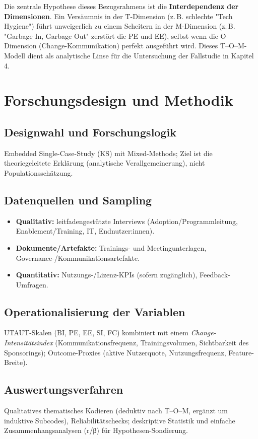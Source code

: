 \documentclass[12pt,a4paper,oneside]{article} %
\begin{document}
Die zentrale Hypothese dieses Bezugsrahmens ist die \textbf{Interdependenz der Dimensionen}. Ein Versäumnis in der T-Dimension (z.\,B. schlechte "Tech Hygiene") führt unweigerlich zu einem Scheitern in der M-Dimension (z.\,B. "Garbage In, Garbage Out" zerstört die PE und EE), selbst wenn die O-Dimension (Change-Kommunikation) perfekt ausgeführt wird. Dieses T–O–M-Modell dient als analytische Linse für die Untersuchung der Fallstudie in Kapitel 4.


\section{Forschungsdesign und Methodik}
\subsection{Designwahl und Forschungslogik}
Embedded Single-Case-Study (KS) mit Mixed-Methods; Ziel ist die theoriegeleitete Erklärung (analytische Verallgemeinerung), nicht Populationsschätzung.

\subsection{Datenquellen und Sampling}
\begin{itemize}
    \item \textbf{Qualitativ:} leitfadengestützte Interviews (Adoption/Programmleitung, Enablement/Training, IT, Endnutzer:innen).
    \item \textbf{Dokumente/Artefakte:} Trainings- und Meetingunterlagen, Governance-/Kommunikationsartefakte.
    \item \textbf{Quantitativ:} Nutzungs-/Lizenz-KPIs (sofern zugänglich), Feedback-Umfragen.
\end{itemize}

\subsection{Operationalisierung der Variablen}
UTAUT-Skalen (BI, PE, EE, SI, FC) kombiniert mit einem \emph{Change-Intensitätsindex} (Kommunikationsfrequenz, Trainingsvolumen, Sichtbarkeit des Sponsorings); Outcome-Proxies (aktive Nutzerquote, Nutzungsfrequenz, Feature-Breite).

\subsection{Auswertungsverfahren}
Qualitatives thematisches Kodieren (deduktiv nach T–O–M, ergänzt um induktive Subcodes), Reliabilitätschecks; deskriptive Statistik und einfache Zusammenhangsanalysen (r/β) für Hypothesen-Sondierung.
\end{document}
